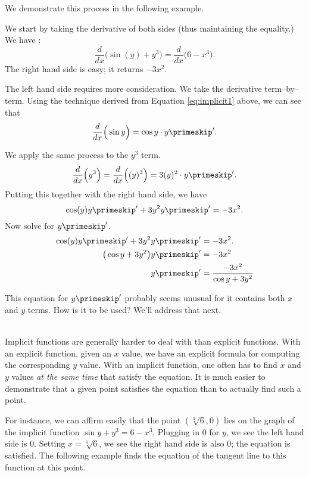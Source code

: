 We demonstrate this process in the following example.\\

{We start by taking the derivative of both sides (thus maintaining the equality.) We have :
$$ \frac{d}{dx}\Big(\sin(y) + y^3\Big)=\frac{d}{dx}\Big(6-x^3\Big).$$
The right hand side is easy; it returns $-3x^2$. 

The left hand side requires more consideration. We take the derivative term--by--term.  Using the technique derived from Equation \ref{eq:implicit1} above, we can see that $$\frac{d}{dx}\Big(\sin y\Big) = \cos y \cdot y\primeskip'.$$ %

We apply the same process to the $y^3$ term. 
$$\frac{d}{dx}\Big(y^3\Big) = \frac{d}{dx}\Big((y)^3\Big) = 3(y)^2\cdot y\primeskip'.$$
Putting this together with the right hand side, we have
$$\cos(y)y\primeskip'+3y^2y\primeskip' = -3x^2.$$
Now solve for $y\primeskip'$.
		\begin{align*}
		\cos(y)y\primeskip'+3y^2y\primeskip' 	&= -3x^2.\\
		\big(\cos y+3y^2\big)y\primeskip' &=	-3x^2\\
		y\primeskip'&=	\frac{-3x^2}{\cos y+3y^2}
		\end{align*}

This equation for $y\primeskip'$ probably seems unusual for it contains both $x$ and $y$ terms. How is it to be used? We'll address that next.}\\

Implicit functions are generally harder to deal with than explicit functions. With an explicit function, given an $x$ value, we have an explicit formula for computing the corresponding $y$ value. With an implicit function, one often has to find $x$ and $y$ values \textit{at the same time} that satisfy the equation. It is much easier to demonstrate that a given point satisfies the equation than to actually find such a point.

For instance, we can affirm easily that the point $(\sqrt[3]{6},0)$ lies on the graph of the implicit function $\sin y + y^3=6-x^3$. Plugging in $0$ for $y$, we see the left hand side is $0$. Setting $x=\sqrt[3]6$, we see the right hand side is also $0$; the equation is satisfied. The following example finds the equation of the tangent line to this function at this point.\\

